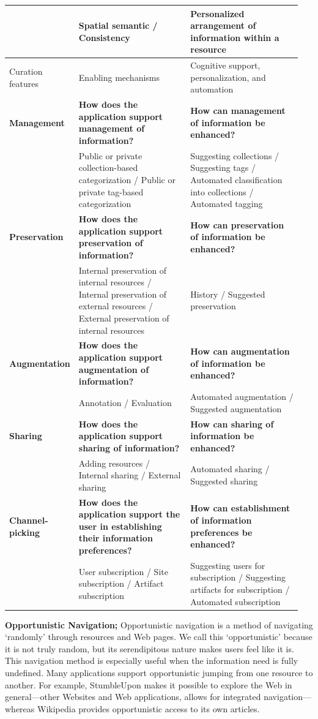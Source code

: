 \documentclass{sigchi}
\newcommand{\feature}[1]{{\ttfamily#1}}
\begin{document}
{\begin{table}[!htb]
\begin{tabular}{|p{0.15\linewidth}| p{0.40\linewidth}| p{0.40\linewidth}|}
& Spatial semantic / Consistency & Personalized arrangement of information within a resource  \\ 
\hline
Curation features &Enabling mechanisms & Cognitive support, personalization, and automation \\
\hline
\textbf{Management} & \textbf{How does the application support management of information?} & \textbf{How can management of information be enhanced?}\\
& Public or private collection-based categorization / Public or private tag-based categorization & Suggesting collections / Suggesting tags / Automated classification into collections / Automated tagging \\
\textbf{Preservation} & \textbf{How does the application support preservation of information?} & \textbf{How can preservation of information be enhanced?}\\
& Internal preservation of internal resources / Internal preservation of external resources / External preservation of internal resources & History / Suggested preservation  \\
\textbf{Augmentation} & \textbf{How does the application support augmentation of information?} & \textbf{How can augmentation of information be enhanced?}\\
& Annotation / Evaluation & Automated augmentation / Suggested augmentation \\ 
\textbf{Sharing} & \textbf{How does the application support sharing of information?} & \textbf{How can sharing of information be enhanced?}\\
& Adding resources / Internal sharing / External sharing & Automated sharing / Suggested sharing \\
\textbf{Channel-picking}  	& \textbf{How does the application support the user in establishing their information preferences?} & \textbf{How can establishment of information preferences be enhanced?}\\
& User subscription / Site subscription / Artifact subscription & Suggesting users for subscription / Suggesting artifacts for subscription / Automated subscription \\     
\hline
\end{tabular}
\end{table}

\textbf{Opportunistic Navigation;}
Opportunistic navigation is a method of navigating `randomly' through resources and Web pages. We call this `opportunistic' because it is not truly random, but its serendipitous nature makes users feel like it is. This navigation method is especially useful when the information need is fully undefined.
%
Many applications support opportunistic jumping from one resource to another. For example, StumbleUpon makes it possible to explore the Web in general---other Websites and Web applications, allows for \feature{integrated} navigation---whereas Wikipedia provides opportunistic access to its own articles. 


}
\end{document}
